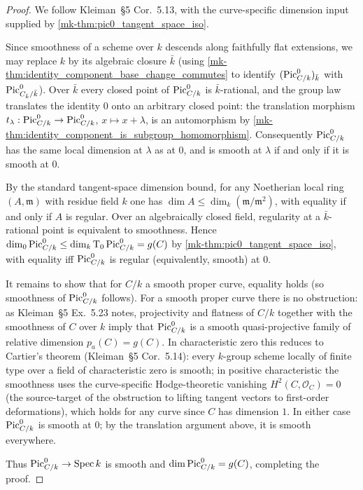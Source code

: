 \begin{proof}
  We follow Kleiman~\S 5 Cor.~5.13, with the curve-specific dimension
  input supplied by \ref{mk-thm:pic0_tangent_space_iso}.

  Since smoothness of a scheme over \(k\) descends along faithfully
  flat extensions, we may replace \(k\) by its algebraic closure
  \(\bar k\) (using \ref{mk-thm:identity_component_base_change_commutes}
  to identify \((\operatorname{Pic}^0_{C/k})_{\bar k}\) with \(\operatorname{Pic}^0_{C_{\bar k}/\bar k}\)).
  Over \(\bar k\) every closed point of \(\operatorname{Pic}^0_{C/k}\) is
  \(\bar k\)-rational, and the group law translates the identity \(0\)
  onto an arbitrary closed point: the translation morphism
  \(t_\lambda : \operatorname{Pic}^0_{C/k} \to \operatorname{Pic}^0_{C/k}\), \(x \mapsto x +
  \lambda\), is an automorphism by
  \ref{mk-thm:identity_component_is_subgroup_homomorphism}. Consequently
  \(\operatorname{Pic}^0_{C/k}\) has the same local dimension at \(\lambda\) as at
  \(0\), and is smooth at \(\lambda\) if and only if it is smooth at
  \(0\).

  By the standard tangent-space dimension bound, for any Noetherian
  local ring \((A, \mathfrak{m})\) with residue field \(k\) one has
  \(\dim A \le \dim_k (\mathfrak{m}/\mathfrak{m}^2)\), with equality
  if and only if \(A\) is regular. Over an algebraically closed field,
  regularity at a \(\bar k\)-rational point is equivalent to
  smoothness. Hence
  \(
    \dim_0 \operatorname{Pic}^0_{C/k} \le \dim_k \textup T_0 \operatorname{Pic}^0_{C/k} = g(C)
  \)
  by \ref{mk-thm:pic0_tangent_space_iso}, with equality iff
  \(\operatorname{Pic}^0_{C/k}\) is regular (equivalently, smooth) at \(0\).

  It remains to show that for \(C/k\) a smooth proper curve, equality
  holds (so smoothness of \(\operatorname{Pic}^0_{C/k}\) follows). For a smooth
  proper curve there is no obstruction: as Kleiman~\S 5 Ex.~5.23
  notes, projectivity and flatness of \(C/k\) together with the
  smoothness of \(C\) over \(k\) imply that \(\operatorname{Pic}^0_{C/k}\) is a
  smooth quasi-projective family of relative dimension \(p_a(C) =
  g(C)\). In characteristic zero this reduces to Cartier's theorem
  (Kleiman~\S 5 Cor.~5.14): every \(k\)-group scheme locally of
  finite type over a field of characteristic zero is smooth; in
  positive characteristic the smoothness uses the curve-specific
  Hodge-theoretic vanishing
  \(H^2(C, \mathcal{O}_C) = 0\) (the source-target of the obstruction
  to lifting tangent vectors to first-order deformations), which holds
  for any curve since \(C\) has dimension \(1\). In either case
  \(\operatorname{Pic}^0_{C/k}\) is smooth at \(0\); by the translation argument
  above, it is smooth everywhere.

  Thus \(\operatorname{Pic}^0_{C/k} \to \operatorname{Spec} k\) is smooth and
  \(\dim \operatorname{Pic}^0_{C/k} = g(C)\), completing the proof.
\end{proof}

